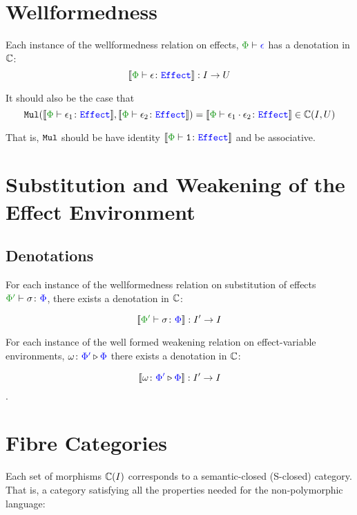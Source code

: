 \documentclass{report}
\begin{document}
\section{Wellformedness}

Each instance of the wellformedness relation on effects, $\wellformed{\P}{\e}$ has a denotation in $\mathbb{C}$: \begin{equation}
    \deno{\typerelation{\P}{\e}{\effect}}: I \rightarrow U
\end{equation}

It should also be the case that \begin{equation}
    \Mul(\deno{\typerelation{\P}{\e_1}{\effect}}, \deno{\typerelation{\P}{\e_2}{\effect}}) = \deno{\typerelation{\P}{\e_1\dot\e_2}{\effect}} \in \ciu
\end{equation}

That is, $\texttt{Mul}$ should be have identity $\deno{\typerelation{\P}{\1}{\effect}}$ and be associative.


\section{Substitution and Weakening of the Effect Environment}


\subsection{Denotations}


For each instance of the wellformedness relation on substitution of effects $\typerelation{\P'}{\si}{\P}$, there exists a denotation in $\mathbb{C}$:

\begin{equation}
    \deno{\typerelation{\P'}{\si}{\P}}: I'\rightarrow I
\end{equation}

For each instance of the well formed weakening relation on effect-variable environments, $\omega \colon {\color{blue}\Phi'} \triangleright {\color {blue} \Phi}$
 there exists a denotation in $\mathbb{C}$:

\begin{equation}
     {\bf [\![}\omega \colon {\color{blue}\Phi'} \triangleright {\color {blue} \Phi}{\bf ]\!]}: I'\rightarrow I
\end{equation}.

\section{Fibre Categories}
Each set of morphisms $\mathbb{C}(I)$ corresponds to a semantic-closed (S-closed) category. That is, a category satisfying all the properties needed for the non-polymorphic language:
\end{document}
